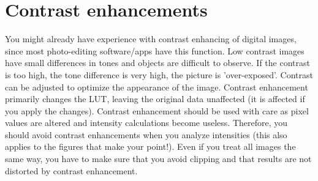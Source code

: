 \section{Contrast enhancements}
You might already have experience with contrast enhancing of digital images, since most photo-editing software/apps have this function. Low contrast images have small differences in tones and objects are difficult to observe. If the contrast is too high, the tone difference is very high, the picture is 'over-exposed'. Contrast can be adjusted to optimize the appearance of the image. Contrast enhancement primarily changes the LUT, leaving the original data unaffected (it is affected if you apply the changes). Contrast enhancement should be used with care as pixel values are altered and intensity calculations become useless. Therefore, you should avoid contrast enhancements when you analyze intensities (this also applies to the figures that make your point!). Even if you treat all images the same way, you have to make sure that you avoid clipping and that results are not distorted by contrast enhancement.

